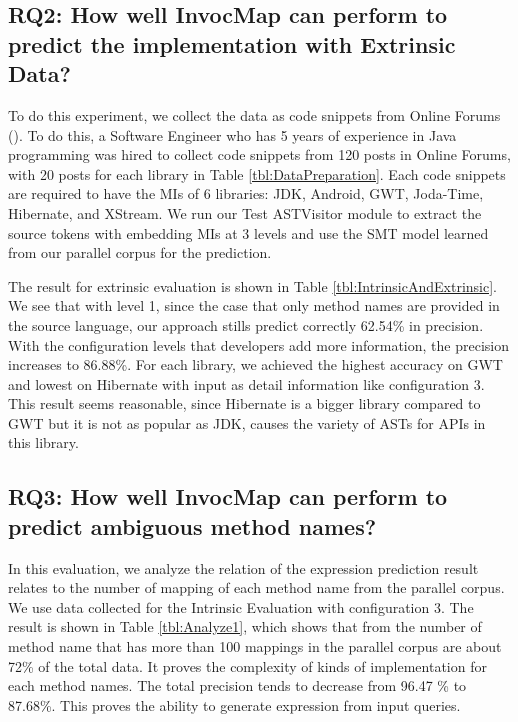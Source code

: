 \subsection{RQ2: How well InvocMap can perform to predict the implementation with Extrinsic Data?}

To do this experiment, we collect the data as code snippets from Online Forums (\cite{id:StackOverflow,id:ProgramCreek,id:GeeksForGeeks}). To do this, a Software Engineer who has 5 years of experience in Java programming was hired to collect code snippets from 120 posts in Online Forums, with 20 posts for each library in Table \ref{tbl:DataPreparation}. Each code snippets are required to have the MIs of 6 libraries: JDK, Android, GWT, Joda-Time, Hibernate, and XStream. We run our Test ASTVisitor module to extract the source tokens with embedding MIs at 3 levels and use the SMT model learned from our parallel corpus for the prediction.

The result for extrinsic evaluation is shown in Table \ref{tbl:IntrinsicAndExtrinsic}. We see that with level 1, since the case that only method names are provided in the source language, our approach stills predict correctly 62.54\% in precision. With the configuration levels that developers add more information, the precision increases to 86.88\%. For each library, we achieved the highest accuracy on GWT and lowest on Hibernate with input as detail information like configuration 3. This result seems reasonable, since Hibernate is a bigger library compared to GWT but it is not as popular as JDK, causes the variety of ASTs for APIs in this library.

\subsection{RQ3: How well InvocMap can perform to predict ambiguous method names?}

In this evaluation, we analyze the relation of the expression prediction result relates to the number of mapping of each method name from the parallel corpus. We use data collected for the Intrinsic Evaluation with configuration 3. The result is shown in Table \ref{tbl:Analyze1}, which shows that from the number of method name that has more than 100 mappings in the parallel corpus are about 72\% of the total data. It proves the complexity of kinds of implementation for each method names. The total precision tends to decrease from 96.47 \% to 87.68\%. This proves the ability to generate expression from input queries.

